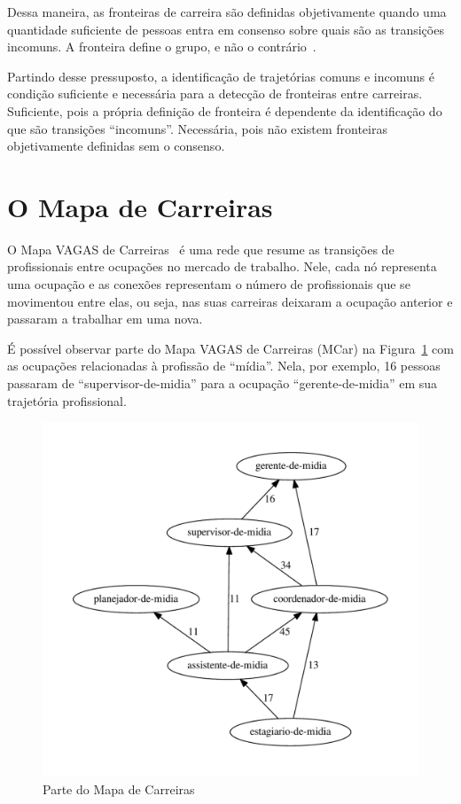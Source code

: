\documentclass[
  article,
  11pt,
  a4paper,
  english,
  brazil,
  sumario=tradicional]{abntex2}
\begin{document}
Dessa maneira, as fronteiras de carreira são definidas objetivamente quando uma quantidade suficiente de pessoas entra em consenso sobre quais são as transições incomuns. A fronteira define o grupo, e não o contrário~\cite{Gunz2007-hr}.

Partindo desse pressuposto, a identificação de trajetórias comuns e incomuns é condição suficiente e necessária para a detecção de fronteiras entre carreiras. Suficiente, pois a própria definição de fronteira é dependente da identificação do que são transições \enquote{incomuns}. Necessária, pois não existem fronteiras objetivamente definidas sem o consenso.

\section{O Mapa de Carreiras} \label{sec:mapa}

O Mapa VAGAS de Carreiras~\cite{VAGAS_Tecnologia2015-yv} é uma rede que resume as transições de profissionais entre ocupações no mercado de trabalho. Nele, cada nó representa uma ocupação e as conexões representam o número de profissionais que se movimentou entre elas, ou seja, nas suas carreiras deixaram a ocupação anterior e passaram a trabalhar em uma nova.

É possível observar parte do Mapa VAGAS de Carreiras (MCar) na Figura~\ref{fig:ex-mapa-midia} com as ocupações relacionadas à profissão de \enquote{mídia}. Nela, por exemplo, 16 pessoas passaram de \enquote{supervisor-de-midia} para a ocupação \enquote{gerente-de-midia} em sua trajetória profissional.

\begin{figure}[ht]
  \centering
  \includegraphics[scale=0.6]{cluster_23.pdf}
  \caption{Parte do Mapa de Carreiras}
  \label{fig:ex-mapa-midia}
\end{figure}
\end{document}
